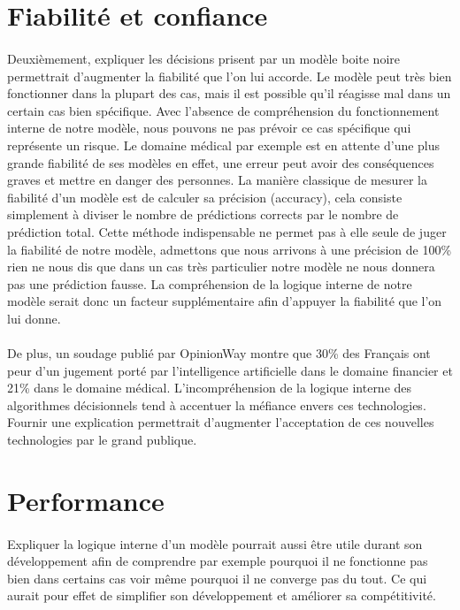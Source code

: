 \section{Fiabilité et confiance}
\paragraph{}Deuxièmement, expliquer les décisions prisent par un modèle boite noire permettrait d'augmenter la fiabilité que l'on lui accorde. Le modèle peut très bien fonctionner dans la plupart des cas, mais il est possible qu'il réagisse mal dans un certain cas bien spécifique. Avec l'absence de compréhension du fonctionnement interne de notre modèle, nous pouvons ne pas prévoir ce cas spécifique qui représente un risque. Le domaine médical par exemple est en attente d'une plus grande fiabilité de ses modèles en effet, une erreur peut avoir des conséquences graves et mettre en danger des personnes. La manière classique de mesurer la fiabilité d'un modèle est de calculer sa précision (accuracy), cela consiste simplement à diviser le nombre de prédictions corrects par le nombre de prédiction total. Cette méthode indispensable ne permet pas à elle seule de juger la fiabilité de notre modèle, admettons que nous arrivons à une précision de 100\% rien ne nous dis que dans un cas très particulier notre modèle ne nous donnera pas une prédiction fausse. La compréhension de la logique interne de notre modèle serait donc un facteur supplémentaire afin d'appuyer la fiabilité que l'on lui donne.
\paragraph{}De plus, un soudage publié par OpinionWay\cite{opinionWay} montre que 30\% des Français ont peur d'un jugement porté par l'intelligence artificielle dans le domaine financier et 21\% dans le domaine médical. L'incompréhension de la logique interne des algorithmes décisionnels tend à accentuer la méfiance envers ces technologies. Fournir une explication permettrait d'augmenter l'acceptation de ces nouvelles technologies par le grand publique.

\section{Performance}
\paragraph{}Expliquer la logique interne d'un modèle pourrait aussi être utile durant son développement afin de comprendre par exemple pourquoi il ne fonctionne pas bien dans certains cas voir même pourquoi il ne converge pas du tout. Ce qui aurait pour effet de simplifier son développement et améliorer sa compétitivité.

